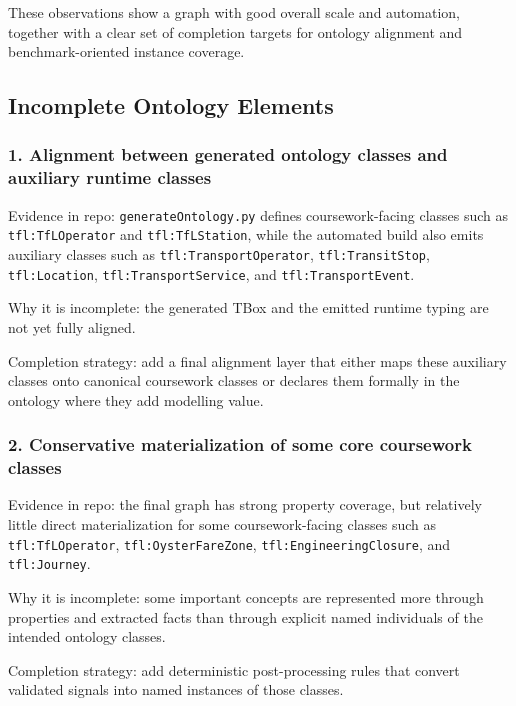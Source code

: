 \documentclass[
  11pt,
  a4paper,
]{article}
\begin{document}
These observations show a graph with good overall scale and automation,
together with a clear set of completion targets for ontology alignment
and benchmark-oriented instance coverage.

\subsection{Incomplete Ontology
Elements}\label{incomplete-ontology-elements}

\subsubsection{1. Alignment between generated ontology classes and
auxiliary runtime
classes}\label{1-alignment-between-generated-ontology-classes-and-auxiliary-runtime-classes}

Evidence in repo: \texttt{generateOntology.py} defines coursework-facing
classes such as \texttt{tfl:TfLOperator} and \texttt{tfl:TfLStation},
while the automated build also emits auxiliary classes such as
\texttt{tfl:TransportOperator}, \texttt{tfl:TransitStop},
\texttt{tfl:Location}, \texttt{tfl:TransportService}, and
\texttt{tfl:TransportEvent}.

Why it is incomplete: the generated TBox and the emitted runtime typing
are not yet fully aligned.

Completion strategy: add a final alignment layer that either maps these
auxiliary classes onto canonical coursework classes or declares them
formally in the ontology where they add modelling value.

\subsubsection{2. Conservative materialization of some core coursework
classes}\label{2-conservative-materialization-of-some-core-coursework-classes}

Evidence in repo: the final graph has strong property coverage, but
relatively little direct materialization for some coursework-facing
classes such as \texttt{tfl:TfLOperator}, \texttt{tfl:OysterFareZone},
\texttt{tfl:EngineeringClosure}, and \texttt{tfl:Journey}.

Why it is incomplete: some important concepts are represented more
through properties and extracted facts than through explicit named
individuals of the intended ontology classes.

Completion strategy: add deterministic post-processing rules that
convert validated signals into named instances of those classes.
\end{document}
